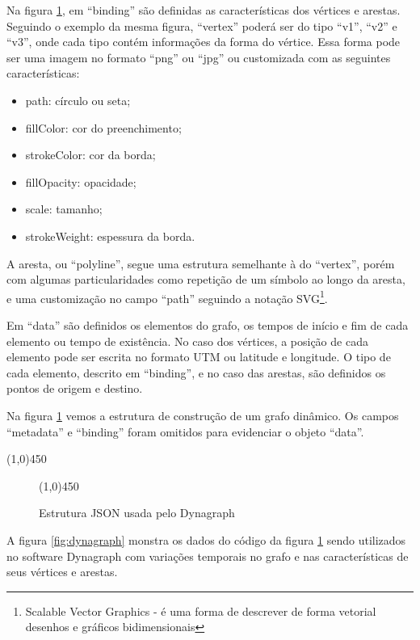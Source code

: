 Na figura \ref{fig:jsondynagraph}, em ``binding'' são definidas as características dos vértices e arestas.
Seguindo o exemplo da mesma figura, ``vertex'' poderá
ser do tipo ``v1'', ``v2'' e ``v3'', onde cada tipo contém informações da forma do vértice. Essa forma pode ser uma imagem no formato
``png'' ou ``jpg'' ou customizada com as seguintes características:
\begin{itemize}
\item path: círculo ou seta;
\item fillColor: cor do preenchimento;
\item strokeColor: cor da borda;
\item fillOpacity: opacidade;
\item scale: tamanho;
\item strokeWeight: espessura da borda.
\end{itemize}
A aresta, ou ``polyline'', segue uma estrutura semelhante à do ``vertex'', porém com algumas particularidades como repetição de um símbolo
ao longo da aresta, e uma customização no campo ``path'' seguindo a notação
SVG\footnote{\label{note} Scalable Vector Graphics - é uma forma de descrever de forma vetorial desenhos e gráficos bidimensionais}.

Em ``data'' são definidos os elementos do grafo, os tempos de início e fim de cada elemento ou tempo de existência.
No caso dos vértices, a posição de cada elemento pode ser escrita no formato UTM ou latitude e longitude.
O tipo de cada elemento, descrito em ``binding'', e no caso das arestas, são definidos os pontos de origem e destino.

Na figura \ref{fig:jsondynagraph} vemos a estrutura de construção de um grafo dinâmico.
Os campos ``metadata'' e ``binding'' foram omitidos para evidenciar o objeto ``data''.
\FloatBarrier
\begin{center}
  \line(1,0){450}
\end{center}

\begin{figure}[htbp]
  \begin{center}
    \line(1,0){450}
  \end{center}
  \centering
  \caption{Estrutura JSON usada pelo Dynagraph}
  \label{fig:jsondynagraph}
\end{figure}

A figura \ref{fig:dynagraph} monstra os dados do código da figura \ref{fig:jsondynagraph} sendo utilizados no software
Dynagraph com variações temporais no grafo e nas características de seus vértices e arestas.

